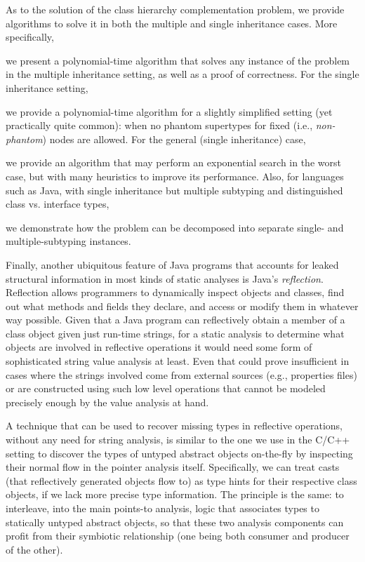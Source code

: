 As to the solution of the class hierarchy complementation problem, we
provide algorithms to solve it in both the multiple and single
inheritance cases. More specifically,
\begin{inparaenum}[(1)]
\item we present a polynomial-time algorithm that solves any instance
  of the problem in the multiple inheritance setting, as well as a
  proof of correctness.
  For the single inheritance setting,
\item we provide a polynomial-time algorithm for a slightly simplified
  setting (yet practically quite common): when no phantom
  supertypes for fixed (i.e., \emph{non-phantom}) nodes are allowed.
  For the general (single inheritance) case,
\item we provide an algorithm that may perform an exponential search
  in the worst case, but with many heuristics to improve its
  performance.
  Also, for languages such as Java, with single inheritance but
  multiple subtyping and distinguished class vs.  interface types,
\item we demonstrate how the problem can be decomposed into separate
  single- and multiple-subtyping instances.
\end{inparaenum}

Finally, another ubiquitous feature of Java programs that accounts for
leaked structural information in most kinds of static analyses is
Java's \emph{reflection}. Reflection allows programmers to
dynamically inspect objects and classes, find out what methods and
fields they declare, and access or modify them in whatever way
possible. Given that a Java program can reflectively obtain a member
of a class object given just run-time strings, for a static analysis
to determine what objects are involved in reflective operations it
would need some form of sophisticated string value analysis at
least. Even that could prove insufficient in cases where the strings
involved come from external sources (e.g., properties files) or are
constructed using such low level operations that cannot be modeled
precisely enough by the value analysis at hand.

A technique that can be used to recover missing types in reflective
operations, without any need for string analysis, is similar to the
one we use in the C/C++ setting to discover the types of untyped abstract
objects on-the-fly by inspecting their normal flow in the
pointer analysis itself. Specifically, we can treat casts (that
reflectively generated objects flow to) as type hints for their
respective class objects, if we lack more precise type
information. The principle is the same: to interleave, into the main
points-to analysis, logic that associates types to statically untyped
abstract objects, so that these two analysis components can profit
from their symbiotic relationship (one being both consumer and
producer of the other).


